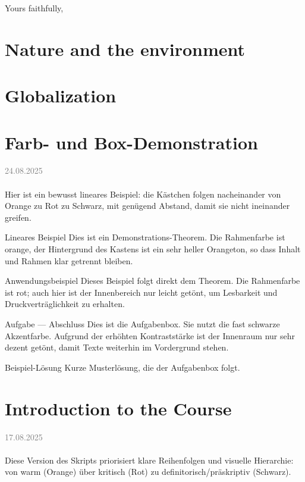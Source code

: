 \documentclass[11pt,a4paper,oneside]{article}
\newcommand{\lessondate}[1]{
	\noindent\hfill\textcolor{gray}{\textsc{#1}} \\
	\vspace{0.5cm}
}
\begin{document}
	Yours faithfully,
	\newpage
	
	\section{Nature and the environment}
	\section{Globalization}
	
	
	\newpage
	
	
	\section{Farb- und Box-Demonstration}

	
	\lessondate{24.08.2025}\\
	Hier ist ein bewusst lineares Beispiel: die Kästchen folgen nacheinander von Orange zu Rot zu Schwarz, mit genügend Abstand, damit sie nicht ineinander greifen.
	
	\begin{theorem}{Lineares Beispiel}
		Dies ist ein Demonstrations-Theorem. Die Rahmenfarbe ist orange, der Hintergrund des Kastens ist ein sehr heller Orangeton, so dass Inhalt und Rahmen klar getrennt bleiben.
	\end{theorem}
	
	\begin{example}{Anwendungsbeispiel}
		Dieses Beispiel folgt direkt dem Theorem. Die Rahmenfarbe ist rot; auch hier ist der Innenbereich nur leicht getönt, um Lesbarkeit und Druckverträglichkeit zu erhalten.
	\end{example}
	
	\begin{task}{Aufgabe — Abschluss}
		Dies ist die Aufgabenbox. Sie nutzt die fast schwarze Akzentfarbe. Aufgrund der erhöhten Kontraststärke ist der Innenraum nur sehr dezent getönt, damit Texte weiterhin im Vordergrund stehen.
	\end{task}
	
	\begin{solution}{Beispiel-Lösung}
		Kurze Musterlösung, die der Aufgabenbox folgt.
	\end{solution}
	
	\clearpage
	\section{Introduction to the Course}
	\lessondate{17.08.2025}\\
	Diese Version des Skripts priorisiert klare Reihenfolgen und visuelle Hierarchie: von warm (Orange) über kritisch (Rot) zu definitorisch/präskriptiv (Schwarz).
	
	
\end{document}
